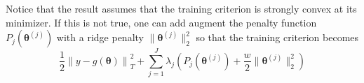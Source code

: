 \documentclass[12pt]{article}
\begin{document}
Notice that the result assumes that the training criterion is strongly convex at its minimizer. If this is not true, one can add augment the penalty function $P_j(\boldsymbol{\theta}^{(j)})$ with a ridge penalty $\| \boldsymbol{\theta}^{(j)} \|_2^2$ so that the training criterion becomes
\begin{equation}
\label{eq:param_add_models_ridge}
\frac{1}{2} \left  \| y -  g(\boldsymbol{\theta}) \right \|^2_T 
+ \sum_{j=1}^J \lambda_j \left ( P_j(\boldsymbol{\theta}^{(j)}) + \frac{w}{2} \| \boldsymbol{\theta}^{(j)} \|^2_2 \right )
\end{equation}




\end{document}
